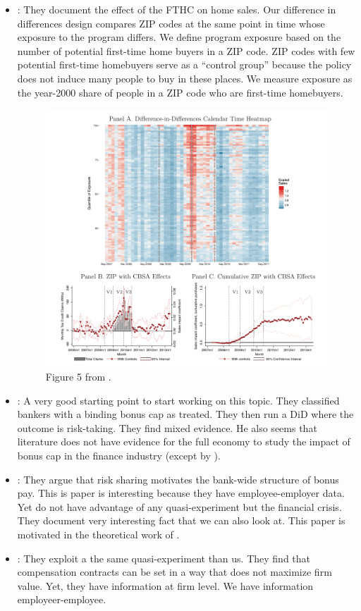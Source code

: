 \documentclass[12pt]{article}
\begin{document}
\begin{itemize}
	
	\item \citet{berger2020stimulating}: They document the effect of the FTHC on home sales. Our difference in differences design compares ZIP codes at the same point in time whose
	exposure to the program differs. We define program exposure based on the number of potential first-time home buyers in a ZIP code. ZIP codes with few potential first-time homebuyers serve as a “control group” because the policy does not induce many people to buy in these places. We measure exposure as
	the year-2000 share of people in a ZIP code who are first-time homebuyers. 
	
	\begin{figure}
		\centering
		\caption{Figure 5 from \citet{berger2020stimulating}.}
		\includegraphics[width=0.7\linewidth]{figure5_empirical_approach}
		
		\label{fig:figure5empiricalapproach}
	\end{figure}
	
	
	
	\item \citet{colonnello2018effectiveness}:  A very good starting point to start working on this topic. They classified bankers with a binding bonus cap as treated.  They then run a DiD where the outcome is risk-taking.  They find mixed evidence. He also seems that literature does not have evidence for the full economy to study the impact of bonus cap in the finance industry (except by \citet{abudy2020executive}).   
	\item \citet{efing2018bank}: They argue that risk sharing motivates the bank-wide structure of bonus pay. This is paper is interesting because they have employee-employer data. Yet do not have advantage of any quasi-experiment but the financial crisis.  They document very interesting fact that we can also look at. This paper is motivated in the theoretical work of \citet{thanassoulis2012case}.
	\item \citet{abudy2020executive}: They exploit a the same quasi-experiment than us.  They find that compensation
	contracts can be set in a way that does not maximize firm value. Yet, they have information at firm level. We have information employeer-employee. 
	
\end{itemize}
\end{document}
